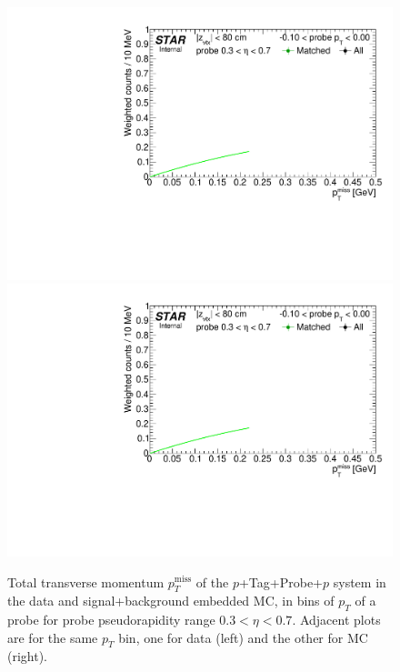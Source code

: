 %
\begin{figure}[ht]\vspace{-260pt}
\caption[Tag\&Probe fits to $p_{T}^{\text{miss}}$ in bins of probe $p_{T}$.]{Total transverse momentum $p_{T}^{\text{miss}}$ of the $p$+Tag+Probe+$p$ system in the data and signal+background embedded MC, in bins of $p_{T}$ of a probe for probe pseudorapidity range $0.3<\eta<0.7$. Adjacent plots are for the same $p_{T}$ bin, one for data (left) and the other for MC (right).}\label{fig:tagAndProbeTofEffFits_Pt_BinA}
\centering
\parbox{0.24\textwidth}{ 
  \centering
  \includegraphics[width=\linewidth,page=5]{graphics/correctionsToEff/TOF_tagAndProbe/Fitting_effVsPt_data_ETABINS_A.CPT2.pdf}\\
  \includegraphics[width=\linewidth,page=7]{graphics/correctionsToEff/TOF_tagAndProbe/Fitting_effVsPt_data_ETABINS_A.CPT2.pdf}\\
}
\end{figure}
